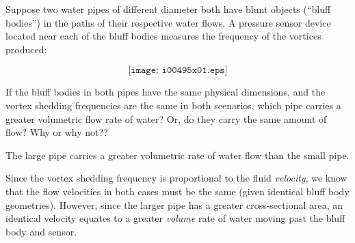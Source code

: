 

Suppose two water pipes of different diameter both have blunt objects (``bluff bodies'') in the paths of their respective water flows.  A pressure sensor device located near each of the bluff bodies measures the frequency of the vortices produced:

$$\texttt{[image: i00495x01.eps]}$$

If the bluff bodies in both pipes have the same physical dimensions, and the vortex shedding frequencies are the same in both scenarios, which pipe carries a greater volumetric flow rate of water?  Or, do they carry the same amount of flow?  Why or why not??







The large pipe carries a greater volumetric rate of water flow than the small pipe.

\vskip 10pt

Since the vortex shedding frequency is proportional to the fluid {\it velocity}, we know that the flow velocities in both cases must be the same (given identical bluff body geometries).  However, since the larger pipe has a greater cross-sectional area, an identical velocity equates to a greater {\it volume} rate of water moving past the bluff body and sensor.











